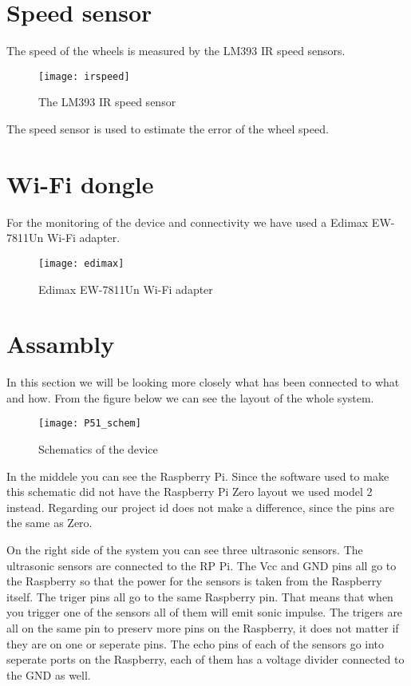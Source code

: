 \section{Speed sensor}

The speed of the wheels is measured by the LM393 IR speed sensors.

\begin{figure}[h]
\centering
\texttt{[image: irspeed]}
\caption{The LM393 IR speed sensor}
\label{fig::driver2}
\end{figure}

The speed sensor is used to estimate the error of the wheel speed.

\section{Wi-Fi dongle}

For the monitoring of the device and connectivity we have used a Edimax EW-7811Un Wi-Fi adapter.

\begin{figure}[h]
\centering
\texttt{[image: edimax]}
\caption{Edimax EW-7811Un Wi-Fi adapter}
\label{fig::edimax}
\end{figure}

\section{Assambly}

In this section we will be looking more closely what has been connected to what and how.
From the figure below we can see the layout of the whole system.

\begin{figure}[h]
\centering
\texttt{[image: P51\_schem]}
\caption{Schematics of the device}
\label{fig::schematics}
\end{figure}

In the middele you can see the Raspberry Pi.
Since the software used to make this schematic did not have the Raspberry Pi Zero layout we used model 2 instead.
Regarding our project id does not make a difference, since the pins are the same as Zero.

On the right side of the system you can see three ultrasonic sensors.
The ultrasonic sensors are connected to the RP Pi.
The Vcc and GND pins all go to the Raspberry so that the power for the sensors is taken from the Raspberry itself.
The triger pins all go to the same Raspberry pin.
That means that when you trigger one of the sensors all of them will emit sonic impulse.
The trigers are all on the same pin to preserv more pins on the Raspberry, it does not matter if they are on one or seperate pins.
The echo pins of each of the sensors go into seperate ports on the Raspberry, each of them has a voltage divider connected to the GND as well.

